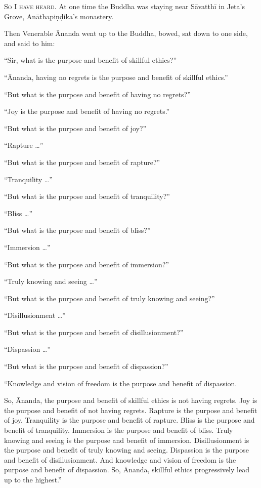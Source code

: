 \documentclass[12pt,openany]{book}%
\newcommand*{\scevam}[1]{\textsc{#1}}
\begin{document}
\scevam{So I have heard. }At one time the Buddha was staying near \textsanskrit{Sāvatthī} in Jeta’s Grove, \textsanskrit{Anāthapiṇḍika}’s monastery. 

Then Venerable Ānanda went up to the Buddha, bowed, sat down to one side, and said to him: 

“Sir, what is the purpose and benefit of skillful ethics?” 

“Ānanda, having no regrets is the purpose and benefit of skillful ethics.” 

“But what is the purpose and benefit of having no regrets?” 

“Joy is the purpose and benefit of having no regrets.” 

“But what is the purpose and benefit of joy?” 

“Rapture …” 

“But what is the purpose and benefit of rapture?” 

“Tranquility …” 

“But what is the purpose and benefit of tranquility?” 

“Bliss …” 

“But what is the purpose and benefit of bliss?” 

“Immersion …” 

“But what is the purpose and benefit of immersion?” 

“Truly knowing and seeing …” 

“But what is the purpose and benefit of truly knowing and seeing?” 

“Disillusionment …” 

“But what is the purpose and benefit of disillusionment?” 

“Dispassion …” 

“But what is the purpose and benefit of dispassion?” 

“Knowledge and vision of freedom is the purpose and benefit of dispassion. 

So, Ānanda, the purpose and benefit of skillful ethics is not having regrets. Joy is the purpose and benefit of not having regrets. Rapture is the purpose and benefit of joy. Tranquility is the purpose and benefit of rapture. Bliss is the purpose and benefit of tranquility. Immersion is the purpose and benefit of bliss. Truly knowing and seeing is the purpose and benefit of immersion. Disillusionment is the purpose and benefit of truly knowing and seeing. Dispassion is the purpose and benefit of disillusionment. And knowledge and vision of freedom is the purpose and benefit of dispassion. So, Ānanda, skillful ethics progressively lead up to the highest.” 
\end{document}
